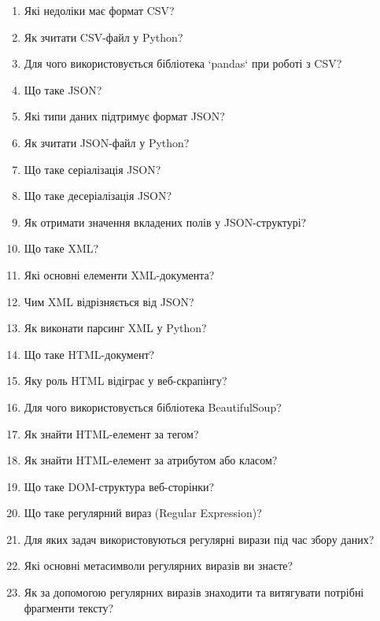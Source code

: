 \begin{enumerate}
\item Які недоліки має формат CSV?
\item Як зчитати CSV-файл у Python?
\item Для чого використовується бібліотека `pandas` при роботі з CSV?
\item Що таке JSON?
\item Які типи даних підтримує формат JSON?
\item Як зчитати JSON-файл у Python?
\item Що таке серіалізація JSON?
\item Що таке десеріалізація JSON?
\item Як отримати значення вкладених полів у JSON-структурі?
\item Що таке XML?
\item Які основні елементи XML-документа?
\item Чим XML відрізняється від JSON?
\item Як виконати парсинг XML у Python?
\item Що таке HTML-документ?
\item Яку роль HTML відіграє у веб-скрапінгу?
\item Для чого використовується бібліотека BeautifulSoup?
\item Як знайти HTML-елемент за тегом?
\item Як знайти HTML-елемент за атрибутом або класом?
\item Що таке DOM-структура веб-сторінки?
\item Що таке регулярний вираз (Regular Expression)?
\item Для яких задач використовуються регулярні вирази під час збору даних?
\item Які основні метасимволи регулярних виразів ви знаєте?
\item Як за допомогою регулярних виразів знаходити та витягувати потрібні фрагменти тексту?
\end{enumerate}




